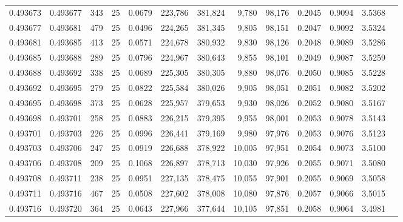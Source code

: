\begin{tabular}{rrrrrrrrrrrrr}
0.493673 & 0.493677 &   343 &  25 &                                     0.0679 & 223,786 & 381,824 &   9,780 &  98,176 & 0.2045 & 0.9094 & 3.5368 \\
0.493677 & 0.493681 &   479 &  25 &                                     0.0496 & 224,265 & 381,345 &   9,805 &  98,151 & 0.2047 & 0.9092 & 3.5324 \\
0.493681 & 0.493685 &   413 &  25 &                                     0.0571 & 224,678 & 380,932 &   9,830 &  98,126 & 0.2048 & 0.9089 & 3.5286 \\
0.493685 & 0.493688 &   289 &  25 &                                     0.0796 & 224,967 & 380,643 &   9,855 &  98,101 & 0.2049 & 0.9087 & 3.5259 \\
0.493688 & 0.493692 &   338 &  25 &                                     0.0689 & 225,305 & 380,305 &   9,880 &  98,076 & 0.2050 & 0.9085 & 3.5228 \\
0.493692 & 0.493695 &   279 &  25 &                                     0.0822 & 225,584 & 380,026 &   9,905 &  98,051 & 0.2051 & 0.9082 & 3.5202 \\
0.493695 & 0.493698 &   373 &  25 &                                     0.0628 & 225,957 & 379,653 &   9,930 &  98,026 & 0.2052 & 0.9080 & 3.5167 \\
0.493698 & 0.493701 &   258 &  25 &                                     0.0883 & 226,215 & 379,395 &   9,955 &  98,001 & 0.2053 & 0.9078 & 3.5143 \\
0.493701 & 0.493703 &   226 &  25 &                                     0.0996 & 226,441 & 379,169 &   9,980 &  97,976 & 0.2053 & 0.9076 & 3.5123 \\
0.493703 & 0.493706 &   247 &  25 &                                     0.0919 & 226,688 & 378,922 &  10,005 &  97,951 & 0.2054 & 0.9073 & 3.5100 \\
0.493706 & 0.493708 &   209 &  25 &                                     0.1068 & 226,897 & 378,713 &  10,030 &  97,926 & 0.2055 & 0.9071 & 3.5080 \\
0.493708 & 0.493711 &   238 &  25 &                                     0.0951 & 227,135 & 378,475 &  10,055 &  97,901 & 0.2055 & 0.9069 & 3.5058 \\
0.493711 & 0.493716 &   467 &  25 &                                     0.0508 & 227,602 & 378,008 &  10,080 &  97,876 & 0.2057 & 0.9066 & 3.5015 \\
0.493716 & 0.493720 &   364 &  25 &                                     0.0643 & 227,966 & 377,644 &  10,105 &  97,851 & 0.2058 & 0.9064 & 3.4981 \\

\end{tabular}
